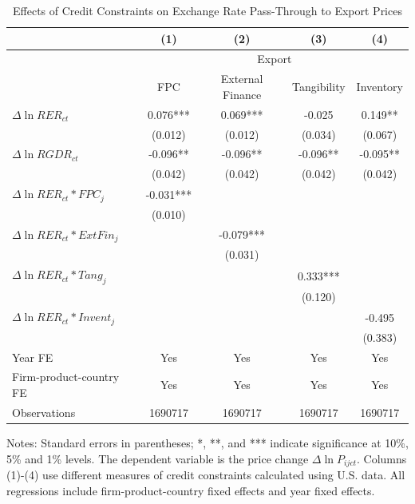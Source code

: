 \documentclass[12pt]{article}
\begin{document}
\begin{table}[htbp]
	\centering
	\caption{Effects of Credit Constraints on Exchange Rate Pass-Through to Export Prices}
	\begin{threeparttable}	
		\begin{tabular}{lcccc}
			\toprule
			& (1)   & (2)   & (3)   & (4) \\
			\midrule
			 & \multicolumn{4}{c}{Export} \\
			& FPC   & External Finance & Tangibility & Inventory \\
			\midrule
			$\Delta \ln RER_{ct}$ & 0.076*** & 0.069*** & -0.025 & 0.149** \\
			& (0.012) & (0.012) & (0.034) & (0.067) \\
			$\Delta \ln RGDR_{ct}$ & -0.096** & -0.096** & -0.096** & -0.095** \\
			& (0.042) & (0.042) & (0.042) & (0.042) \\
			$\Delta \ln RER_{ct}*FPC_{j}$ & -0.031*** &       &       &  \\
			& (0.010) &       &       &  \\
			$\Delta \ln RER_{ct}*ExtFin_{j}$ &       & -0.079*** &       &  \\
			&       & (0.031) &       &  \\
			$\Delta \ln RER_{ct}*Tang_{j}$ &       &       & 0.333*** &  \\
			&       &       & (0.120) &  \\
			$\Delta \ln RER_{ct}*Invent_{j}$ &       &       &       & -0.495 \\
			&       &       &       & (0.383) \\
			Year FE  & Yes   & Yes   & Yes   & Yes \\
			Firm-product-country FE & Yes   & Yes   & Yes   & Yes \\
			Observations & 1690717 & 1690717 & 1690717 & 1690717 \\
			\bottomrule
		\end{tabular}
		\begin{tablenotes}
			\footnotesize
			\item[Notes:] Standard errors in parentheses; *, **, and *** indicate significance at 10\%, 5\% and 1\% levels. The dependent variable is the price change $\Delta \ln P_{ijct}$. Columns (1)-(4) use different measures of credit constraints calculated using U.S. data. All regressions include firm-product-country fixed effects and year fixed effects.
		\end{tablenotes}
	\end{threeparttable}
	\label{tab.credit.exp}
\end{table}
\end{document}
